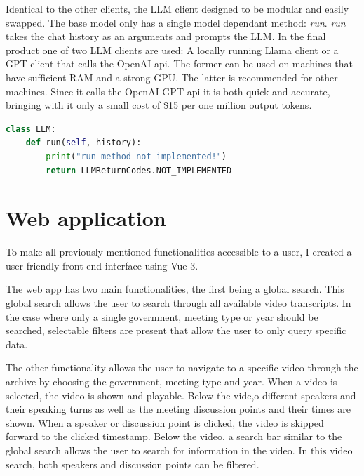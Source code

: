 \documentclass[twoside]{uva-inf-bachelor-thesis}
\begin{document}
Identical to the other clients, the LLM client designed to be modular and easily swapped. The base model only has a single model dependant method: \textit{run}. \textit{run} takes the chat history as an arguments and prompts the LLM. 
In the final product one of two LLM clients are used: A locally running Llama client or a GPT client that calls the OpenAI api. The former can be used on machines that have sufficient RAM and a strong GPU. The latter is recommended for other machines. Since it calls the OpenAI GPT api it is both quick and accurate, bringing with it only a small cost of \$15 per one million output tokens.

\begin{lstlisting}[language=Python, caption={Modular LLM class.}]
class LLM:
    def run(self, history):
        print("run method not implemented!")
        return LLMReturnCodes.NOT_IMPLEMENTED
\end{lstlisting}

\section{Web application}
To make all previously mentioned functionalities accessible to a user, I created a user friendly front end interface using Vue 3.

The web app has two main functionalities, the first being a global search. 
This global search allows the user to search through all available video transcripts. In the case where only a single government, meeting type or year should be searched, selectable filters are present that allow the user to only query specific data.

The other functionality allows the user to navigate to a specific video through the archive by choosing the government, meeting type and year. When a video is selected, the video is shown and playable. 
Below the vide,o different speakers and their speaking turns as well as the meeting discussion points and their times are shown. When a speaker or discussion point is clicked, the video is skipped forward to the clicked timestamp. 
Below the video, a search bar similar to the global search allows the user to search for information in the video. In this video search, both speakers and discussion points can be filtered. 
\end{document}
